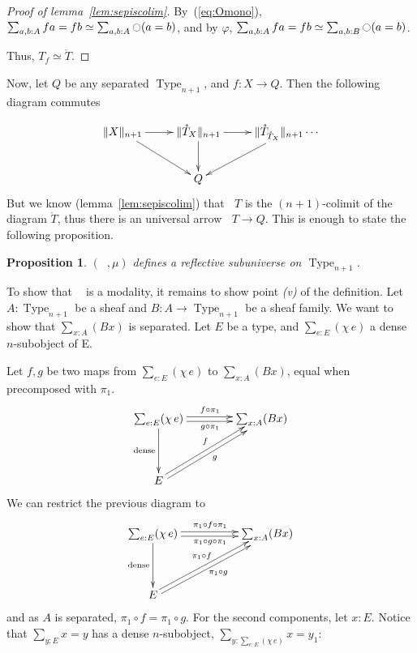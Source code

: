 \documentclass[preprint,9pt,numbers]{sigplanconf}
\makeatletter
\newtheorem{prop}[thm]{Proposition}
\def\dar[#1]#2{\ar@<-#2>[#1]\ar@<#2>[#1]} %
\def\tar[#1]#2{\ar@<#2>[#1]\ar@<0pt>[#1]\ar@<-#2>[#1]} %
\DeclareMathOperator{\Type}{Type}
\newcommand{\modal}{\ensuremath{\ocircle}}
\newcommand \separated {\mathop{\square_{n+1}} }
\newenvironment{mymath}[1][-0em]{%
  \newcommand\mymathaux{\vspace{#1}}%
  \vspace{#1}%
  \begin{equation*}%
  }{ %
    \mymathaux%
  \end{equation*}}
\makeatother
\begin{document}
\begin{proof}[Proof of lemma~\ref{lem:sepiscolim}]
  By~(\ref{eq:Omono}), $\sum_{a,b:A} f a = f b \simeq \sum_{a,b:A} \modal
  (a=b)$, and by $\varphi$, $\sum_{a,b:A} f a = f b \simeq
  \sum_{a,b:B} \modal ( a = b)$.

Thus, $T_f \simeq \mathring T$.
\end{proof}

Now, let $Q$ be any separated $\Type_{n+1}$, and $f:X \to Q$. Then the
following diagram commutes

\begin{mymath}\xymatrix{
\|X\|_{n+1} \ar[r] \ar[rd] & \|\mathring T_{X}\|_{n+1} \ar[r] \ar[d] & \|\mathring
  T_{\mathring T_X} \|_{n+1} \ar[ld]\cdots \\
  & Q &
} \end{mymath}%
But we know (lemma~\ref{lem:sepiscolim}) that $\separated T$ is the
$(n+1)$-colimit of the diagram $\mathring T$, thus there is an universal
arrow $\separated T \to Q$.
%
This is enough to state the following proposition.
\begin{prop}\label{prop:sep-subu}
  $(\separated,\mu)$ defines a reflective subuniverse on $\Type_{n+1}$.
\end{prop}

To show that $\separated$ is a modality, it remains to show point
{\it (v)} of the definition.
%
Let $A:\Type_{n+1}$ be a sheaf and $B:A \to \Type_{n+1}$ be a sheaf
family. We want to show that $\sum_{x:A} (Bx)$ is separated. Let $E$
be a type, and $\sum_{e:E} (\chi\,e)$ a dense $n$-subobject of E.

Let $f,g$ be two maps from $\sum_{e:E} (\chi\,e)$ to $\sum_{x:A}
(Bx)$, equal when precomposed with $\pi_1$.
\begin{mymath}\xymatrix @R=4em @C=4em{
  \sum_{e:E} (\chi\, e) \ar@<-2pt>[r]_{g\circ\pi_1} \ar@<2pt>[r]^{f\circ \pi_1} \ar[d]_{\mathrm{dense}}& \sum_{x :A} (Bx) \\
  E \ar@<-2pt>[ru]_{g} \ar@<2pt>[ru]^{f}&
}\end{mymath}%
We can restrict the previous diagram to 
\begin{mymath}\xymatrix @R=4em @C=5em{
  \sum_{e:E} (\chi\, e) \ar@<-2pt>[r]_{\pi_1\circ g\circ\pi_1} \ar@<2pt>[r]^{\pi_1\circ f\circ \pi_1} \ar[d]_{\mathrm{dense}}& \sum_{x :A} (Bx) \\
  E \ar@<-2pt>[ru]_{\pi_1\circ g} \ar@<2pt>[ru]^{\pi_1\circ f}&
}\end{mymath}%
and as $A$ is separated, $\pi_1\circ f = \pi_1 \circ g$.
For the second components, let $x:E$. Notice that 
$\sum_{y:E} x = y$ has a dense $n$-subobject, $\sum_{y:\sum_{e:E} (\chi\,
  e)} x=y_1$:
\end{document}

